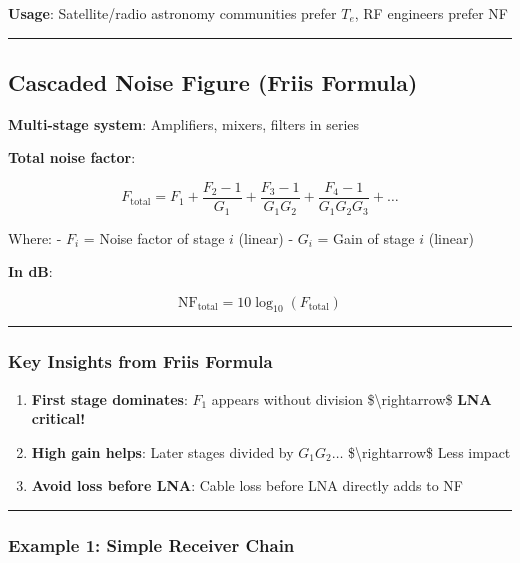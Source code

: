\textbf{Usage}: Satellite/radio astronomy communities prefer \(T_e\), RF
engineers prefer NF

\begin{center}\rule{0.5\linewidth}{0.5pt}\end{center}

\subsection{Cascaded Noise Figure (Friis
Formula)}\label{cascaded-noise-figure-friis-formula}

\textbf{Multi-stage system}: Amplifiers, mixers, filters in series

\textbf{Total noise factor}:

\[
F_{\text{total}} = F_1 + \frac{F_2 - 1}{G_1} + \frac{F_3 - 1}{G_1 G_2} + \frac{F_4 - 1}{G_1 G_2 G_3} + \ldots
\]

Where: - \(F_i\) = Noise factor of stage \(i\) (linear) - \(G_i\) = Gain
of stage \(i\) (linear)

\textbf{In dB}:

\[
\text{NF}_{\text{total}} = 10\log_{10}(F_{\text{total}})
\]

\begin{center}\rule{0.5\linewidth}{0.5pt}\end{center}

\subsubsection{Key Insights from Friis
Formula}\label{key-insights-from-friis-formula}

\begin{enumerate}
\def\labelenumi{\arabic{enumi}.}
\tightlist
\item
  \textbf{First stage dominates}: \(F_1\) appears without division
  \$\textbackslash rightarrow\$ \textbf{LNA critical!}
\item
  \textbf{High gain helps}: Later stages divided by \(G_1 G_2 \ldots\)
  \$\textbackslash rightarrow\$ Less impact
\item
  \textbf{Avoid loss before LNA}: Cable loss before LNA directly adds to
  NF
\end{enumerate}

\begin{center}\rule{0.5\linewidth}{0.5pt}\end{center}

\subsubsection{Example 1: Simple Receiver
Chain}\label{example-1-simple-receiver-chain}

